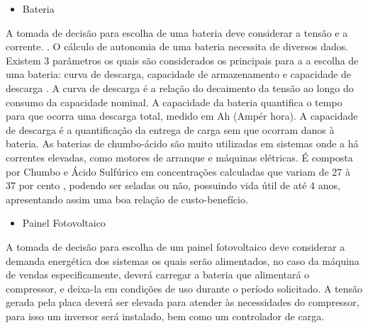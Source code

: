 \begin{itemize}
\item Bateria
\end{itemize}
	  
      A tomada de decisão para escolha de uma bateria deve considerar a tensão e a corrente.  \cite{de2011}. O cálculo de autonomia de uma bateria necessita de diversos dados. Existem 3 parâmetros os quais são considerados os principais para a a escolha de uma bateria: curva de descarga, capacidade de armazenamento e capacidade de descarga \cite{meggiolaro2006tutorial}. A curva de descarga é a relação do decaimento da tensão ao longo do consumo da capacidade nominal. A capacidade da bateria quantifica o tempo para que ocorra uma descarga total, medido em Ah (Ampér hora). A capacidade de descarga é a quantificação da entrega de carga sem que ocorram danos à bateria.
      As baterias de chumbo-ácido são muito utilizadas em sistemas onde a há correntes  elevadas, como motores de arranque e máquinas elétricas. É composta por Chumbo e Ácido Sulfúrico em concentrações calculadas que variam de 27 à 37 por cento \cite{de2005estudo}, podendo ser seladas ou não, possuindo vida útil de até 4 anos, apresentando assim uma boa relação de custo-benefício.
            
\begin{itemize}
\item Painel Fotovoltaico
\end{itemize}

		A tomada de decisão para escolha de um painel fotovoltaico deve considerar a demanda energética dos sistemas os quais serão alimentados, no caso da máquina de vendas especificamente, deverá carregar a bateria que alimentará o compressor, e deixa-la em condições de uso durante o período solicitado. A tensão gerada pela placa deverá ser elevada para atender às necessidades do compressor, para isso um inversor será instalado, bem como um controlador de carga.
        
  